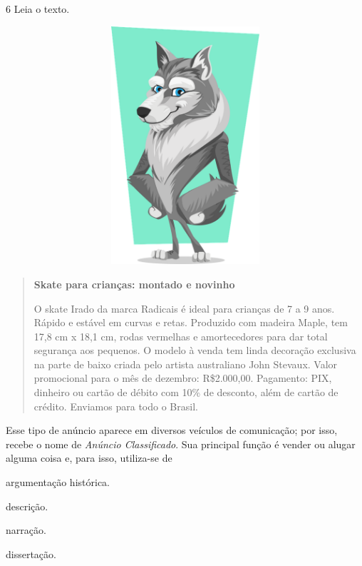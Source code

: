 \num{6} Leia o texto.


\includegraphics[width=5.25000in,height=3.47639in]{media/image5.png}

\begin{quote}
\textbf{Skate para crianças: montado e novinho}

O skate Irado da marca Radicais é ideal para crianças de 7 a 9 anos.
Rápido e estável em curvas e retas. Produzido com madeira Maple, tem
17,8 cm x 18,1 cm, rodas vermelhas e amortecedores para dar total
segurança aos pequenos. O modelo à venda tem linda decoração exclusiva
na parte de baixo criada pelo artista australiano John Stevaux. Valor
promocional para o mês de dezembro: R\$2.000,00. Pagamento: PIX,
dinheiro ou cartão de débito com 10\% de desconto, além de cartão de
crédito. Enviamos para todo o Brasil.

\end{quote}

Esse tipo de anúncio aparece em diversos veículos de comunicação; por
isso, recebe o nome de \emph{Anúncio Classificado}. Sua principal função
é vender ou alugar alguma coisa e, para isso, utiliza-se de

\begin{escolha}
\item argumentação histórica.

\item descrição.

\item narração.

\item dissertação.
\end{escolha}


